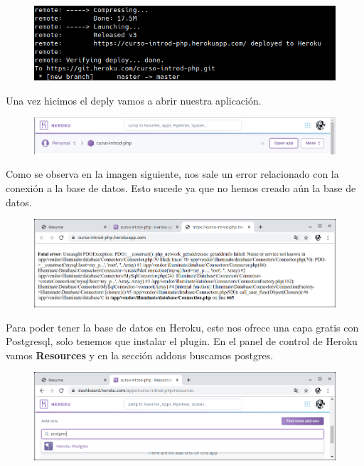 \documentclass{article}
\begin{document}
\begin{figure}[h!]
  \centering
  \includegraphics[scale=0.5]{./Pictures/253_deploy_heroku_ok.png}
\end{figure}

Una vez hicimos el deply vamos a abrir nuestra aplicación.

\begin{figure}[h!]
  \centering
  \includegraphics[scale=0.5]{./Pictures/254_open_app.png}
\end{figure}

Como se observa en la imagen siguiente, nos sale un error relacionado con la
conexión a la base de datos. Esto sucede ya que no hemos creado aún la base de
datos.

\begin{figure}[h!]
  \centering
  \includegraphics[scale=0.5]{./Pictures/255_bd_error.png}
\end{figure}

Para poder tener la base de datos en Heroku, este nos ofrece una capa gratis
con Postgresql, solo tenemos que instalar el plugin. En el panel de control de
Heroku vamos \textbf{Resources} y en la sección addons buscamos postgres.\\

\begin{figure}[h!]
  \centering
  \includegraphics[scale=0.5]{./Pictures/256_addon_postgres.png}
\end{figure}
\end{document}
